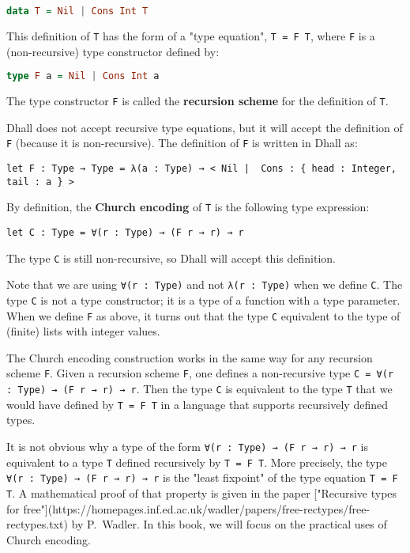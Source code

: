 \begin{lstlisting}[language=Haskell]
data T = Nil | Cons Int T
\end{lstlisting}


This definition of \lstinline!T! has the form of a "type equation", \lstinline!T = F T!, where \lstinline!F! is a (non-recursive) type constructor defined by: 


\begin{lstlisting}[language=Haskell]
type F a = Nil | Cons Int a
\end{lstlisting}


The type constructor \lstinline!F! is called the \textbf{recursion scheme} for the definition of \lstinline!T!.


Dhall does not accept recursive type equations, but it will accept the definition of \lstinline!F! (because it is non-recursive).
The definition of \lstinline!F! is written in Dhall as:


\begin{lstlisting}[language=Dhall]
let F : Type → Type = λ(a : Type) → < Nil |  Cons : { head : Integer, tail : a } >
\end{lstlisting}


By definition, the \textbf{Church encoding} of \lstinline!T! is the following type expression:


\begin{lstlisting}[language=Dhall]
let C : Type = ∀(r : Type) → (F r → r) → r 
\end{lstlisting}


The type \lstinline!C! is still non-recursive, so Dhall will accept this definition.


Note that we are using \lstinline!∀(r : Type)! and not \lstinline!λ(r : Type)! when we define \lstinline!C!.
The type \lstinline!C! is not a type constructor; it is a type of a function with a type parameter.
When we define \lstinline!F! as above, it turns out that the type \lstinline!C! equivalent to the type of (finite) lists with integer values.


The Church encoding construction works in the same way for any recursion scheme \lstinline!F!.
Given a recursion scheme \lstinline!F!, one defines a non-recursive type \lstinline!C = ∀(r : Type) → (F r → r) → r!.
Then the type \lstinline!C! is equivalent to the type \lstinline!T! that we would have defined by \lstinline!T = F T! in a language that supports recursively defined types.


It is not obvious why a type of the form \lstinline!∀(r : Type) → (F r → r) → r! is equivalent to a type \lstinline!T! defined recursively by \lstinline!T = F T!.
More precisely, the type \lstinline!∀(r : Type) → (F r → r) → r! is the "least fixpoint" of the type equation \lstinline!T = F T!.
A mathematical proof of that property is given in the paper ["Recursive types for free"](https://homepages.inf.ed.ac.uk/wadler/papers/free-rectypes/free-rectypes.txt) by P. Wadler.
In this book, we will focus on the practical uses of Church encoding.


